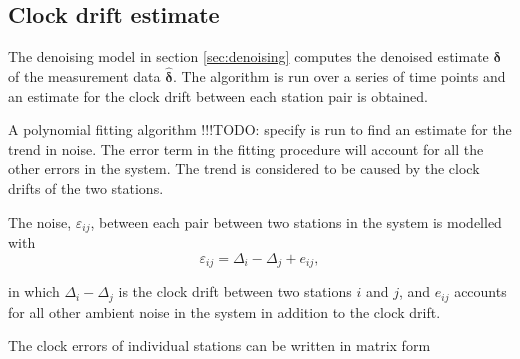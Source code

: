 \documentclass[12pt,a4paper,english]{article}
\newcommand\todo[1]{{\color{red}!!!TODO: #1}}
\begin{document}
\subsection{Clock drift estimate}

The denoising model in section \ref{sec:denoising} computes the denoised estimate $\bm{\delta}$ of the measurement data $\bm{\hat{\delta}}$. The algorithm is run over a series of time points and an estimate for the clock drift between each station pair is obtained. 

A polynomial fitting algorithm \todo{specify} is run to find an estimate for the trend in noise. The error term in the fitting procedure will account for all the other errors in the system. The trend is considered to be caused by the clock drifts of the two stations. 

The noise, $\varepsilon_{ij}$, between each pair between two stations in the system is modelled with 
\begin{equation}
\varepsilon_{ij} =  \Delta_i - \Delta_j  + e_{ij},
\end{equation}

in which $ \Delta_i - \Delta_j $ is the clock drift between two stations $i$ and $j$, and $e_{ij}$ accounts for all other ambient noise in the system in addition to the clock drift. 

The clock errors of individual stations can be written in matrix form 
\end{document}
